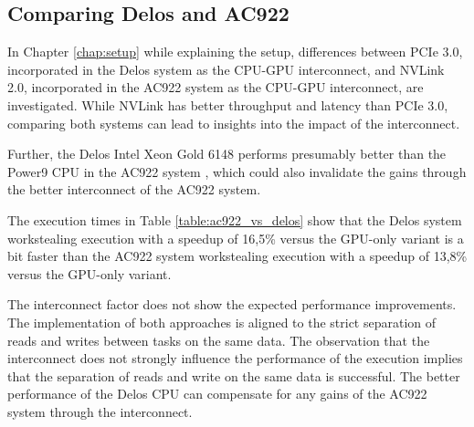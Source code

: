 \subsection{Comparing Delos and AC922}
In Chapter \ref{chap:setup} while explaining the setup, differences between PCIe 3.0, incorporated in the Delos system as the CPU-GPU interconnect, and NVLink 2.0, incorporated in the AC922 system as the CPU-GPU interconnect, are investigated. While NVLink has better throughput and latency than PCIe 3.0, comparing both systems can lead to insights into the impact of the interconnect.

Further, the Delos Intel Xeon Gold 6148 performs presumably better than the Power9 CPU in the AC922 system \cite{POWER9BenchmarksVs}, which could also invalidate the gains through the better interconnect of the AC922 system.



The execution times in Table \ref{table:ac922_vs_delos} show that the Delos system workstealing execution with a speedup of 16,5\% versus the GPU-only variant is a bit faster than the AC922 system workstealing execution with a speedup of 13,8\% versus the GPU-only variant.

The interconnect factor does not show the expected performance improvements. The implementation of both approaches is aligned to the strict separation of reads and writes between tasks on the same data. The observation that the interconnect does not strongly influence the performance of the execution implies that the separation of reads and write on the same data is successful. The better performance of the Delos CPU can compensate for any gains of the AC922 system through the interconnect.



